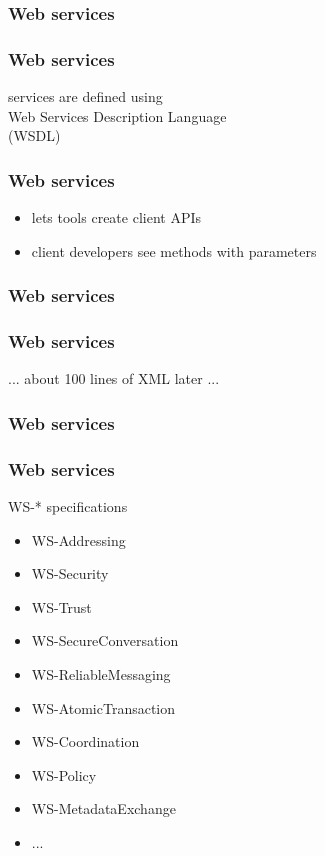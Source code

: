 \begin{frame}[fragile]
  \frametitle{Web services}
  \tiny 
\end{frame}

\begin{frame}
  \frametitle{Web services}
  \begin{center}
    services are defined using\\Web Services Description Language\\(WSDL)
  \end{center}
\end{frame}

\begin{frame}
  \frametitle{Web services}
  \begin{itemize}
  \item lets tools create client APIs
  \item client developers see methods with parameters
  \end{itemize}
\end{frame}


\begin{frame}[fragile]
  \frametitle{Web services}
  \tiny 
\end{frame}

\begin{frame}
  \frametitle{Web services}
  \begin{center}
    ... about 100 lines of XML later ...
  \end{center}
\end{frame}

\begin{frame}[fragile]
  \frametitle{Web services}
  \tiny 
\end{frame}

\begin{frame}
  \frametitle{Web services}
  WS-* specifications
  \begin{itemize}
  \item WS-Addressing
  \item WS-Security
  \item WS-Trust
  \item WS-SecureConversation
  \item WS-ReliableMessaging
  \item WS-AtomicTransaction
  \item WS-Coordination
  \item WS-Policy
  \item WS-MetadataExchange
  \item ...
  \end{itemize}
\end{frame}

